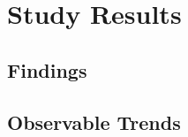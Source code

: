 \section{Study Results}
\label{sec:study-results}


\subsection{Findings}
\label{subsec:findings}


\subsection{Observable Trends}
\label{subsec:observable-trends}

